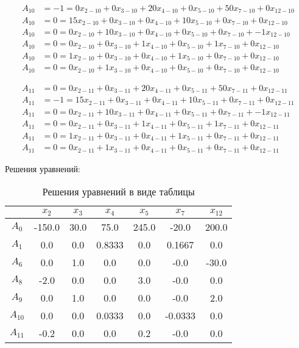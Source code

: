 \vspace{-\baselineskip}\begin{align*}
	A_{10} &= -1 = 0x_{2-10} + 0x_{3-10} + 20x_{4-10} + 0x_{5-10} + 50x_{7-10} + 0x_{12-10} \\ 
	A_{10} &= 0 = 15x_{2-10} + 0x_{3-10} + 0x_{4-10} + 10x_{5-10} + 0x_{7-10} + 0x_{12-10} \\ 
	A_{10} &= 0 = 0x_{2-10} + 10x_{3-10} + 0x_{4-10} + 0x_{5-10} + 0x_{7-10} + -1x_{12-10} \\ 
	A_{10} &= 0 = 0x_{2-10} + 0x_{3-10} + 1x_{4-10} + 0x_{5-10} + 1x_{7-10} + 0x_{12-10} \\ 
	A_{10} &= 0 = 1x_{2-10} + 0x_{3-10} + 0x_{4-10} + 1x_{5-10} + 0x_{7-10} + 0x_{12-10} \\ 
	A_{10} &= 0 = 0x_{2-10} + 1x_{3-10} + 0x_{4-10} + 0x_{5-10} + 0x_{7-10} + 0x_{12-10}
\end{align*}

\vspace{-\baselineskip}\begin{align*}
	A_{11} &= 0 = 0x_{2-11} + 0x_{3-11} + 20x_{4-11} + 0x_{5-11} + 50x_{7-11} + 0x_{12-11} \\ 
	A_{11} &= -1 = 15x_{2-11} + 0x_{3-11} + 0x_{4-11} + 10x_{5-11} + 0x_{7-11} + 0x_{12-11} \\ 
	A_{11} &= 0 = 0x_{2-11} + 10x_{3-11} + 0x_{4-11} + 0x_{5-11} + 0x_{7-11} + -1x_{12-11} \\ 
	A_{11} &= 0 = 0x_{2-11} + 0x_{3-11} + 1x_{4-11} + 0x_{5-11} + 1x_{7-11} + 0x_{12-11} \\ 
	A_{11} &= 0 = 1x_{2-11} + 0x_{3-11} + 0x_{4-11} + 1x_{5-11} + 0x_{7-11} + 0x_{12-11} \\ 
	A_{11} &= 0 = 0x_{2-11} + 1x_{3-11} + 0x_{4-11} + 0x_{5-11} + 0x_{7-11} + 0x_{12-11}
\end{align*}

\normalsize

Решения уравнений:

\begin{table}[H]
	\centering
	\normalsize
	\caption{Решения уравнений в виде таблицы}
	\label{tbl:1}
	\begin{tabular}{|c|c|c|c|c|c|c|}
		\hline
		&$x_{2}$&$x_{3}$&$x_{4}$&$x_{5}$&$x_{7}$&$x_{12}$\\ \hline
		$A_{0}$&-150.0&30.0&75.0&245.0&-20.0&200.0\\ \hline
		$A_{1}$&0.0&0.0&0.8333&0.0&0.1667&0.0\\ \hline
		$A_{6}$&0.0&1.0&0.0&0.0&-0.0&-30.0\\ \hline
		$A_{8}$&-2.0&0.0&0.0&3.0&-0.0&0.0\\ \hline
		$A_{9}$&0.0&1.0&0.0&0.0&-0.0&2.0\\ \hline
		$A_{10}$&0.0&0.0&0.0333&0.0&-0.0333&0.0\\ \hline
		$A_{11}$&-0.2&0.0&0.0&0.2&-0.0&0.0\\ \hline

\end{tabular}

\end{table}

